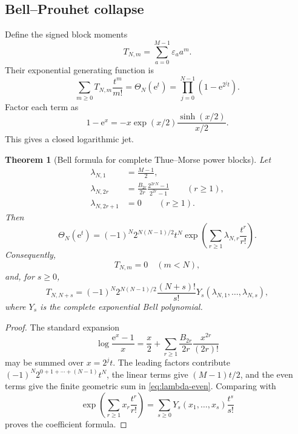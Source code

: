 \documentclass[11pt,oneside]{article}
\numberwithin{equation}{section}
\newtheorem{theorem}{Theorem}[section]
\theoremstyle{definition}
\theoremstyle{remark}
\newcommand{\e}{\mathrm e}
\newcommand{\Bell}{Y}
\newcommand{\ThetaTM}{\Theta}
\begin{document}
\subsection{Bell--Prouhet collapse}

Define the signed block moments
\begin{equation}
 T_{N,m}=\sum_{a=0}^{M-1}\varepsilon_a a^m.
 \label{eq:TNm}
\end{equation}
Their exponential generating function is
\begin{equation}
 \sum_{m\ge0}T_{N,m}\frac{t^m}{m!}
 =\ThetaTM_N(\e^t)
 =\prod_{j=0}^{N-1}(1-\e^{2^jt}).
 \label{eq:T-egf}
\end{equation}
Factor each term as
\[
 1-\e^x=-x\exp(x/2)\frac{\sinh(x/2)}{x/2}.
\]
This gives a closed logarithmic jet.

\begin{theorem}[Bell formula for complete Thue--Morse power blocks]
\label{thm:Bell-Prouhet}
Let
\begin{align}
 \lambda_{N,1}&=\frac{M-1}{2},
 \label{eq:lambda1}\\
 \lambda_{N,2r}&=\frac{B_{2r}}{2r}
 \frac{2^{2rN}-1}{2^{2r}-1}\qquad(r\ge1),
 \label{eq:lambda-even}\\
 \lambda_{N,2r+1}&=0\qquad(r\ge1).
 \label{eq:lambda-odd}
\end{align}
Then
\begin{equation}
 \ThetaTM_N(\e^t)
 =(-1)^N2^{N(N-1)/2}t^N
 \exp\!\left(\sum_{r\ge1}\lambda_{N,r}\frac{t^r}{r!}\right).
 \label{eq:theta-Bell-egf}
\end{equation}
Consequently,
\begin{equation}
 T_{N,m}=0\quad(m<N),
 \label{eq:Prouhet-zero}
\end{equation}
and, for \(s\ge0\),
\begin{equation}
 \boxed{\displaystyle
 T_{N,N+s}=(-1)^N2^{N(N-1)/2}
 \frac{(N+s)!}{s!}
 \Bell_s(\lambda_{N,1},\ldots,\lambda_{N,s}),}
 \label{eq:TN-Bell}
\end{equation}
where \(\Bell_s\) is the complete exponential Bell polynomial.
\end{theorem}

\begin{proof}
The standard expansion
\begin{equation}
 \log\frac{\e^x-1}{x}
 =\frac x2+\sum_{r\ge1}\frac{B_{2r}}{2r}\frac{x^{2r}}{(2r)!}
 \label{eq:log-expm1}
\end{equation}
may be summed over \(x=2^jt\).  The leading factors contribute
\((-1)^N2^{0+1+\cdots+(N-1)}t^N\), the linear terms give
\((M-1)t/2\), and the even terms give the finite geometric sum in
\eqref{eq:lambda-even}.  Comparing with
\[
 \exp\!\left(\sum_{r\ge1}x_r\frac{t^r}{r!}\right)
 =\sum_{s\ge0}\Bell_s(x_1,\ldots,x_s)\frac{t^s}{s!}
\]
proves the coefficient formula.
\end{proof}
\end{document}
